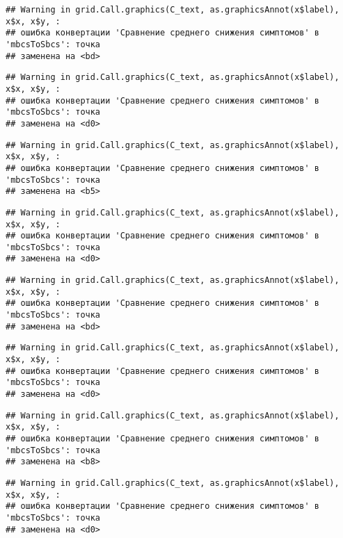 \documentclass[
]{article}
\begin{document}
\begin{verbatim}
## Warning in grid.Call.graphics(C_text, as.graphicsAnnot(x$label), x$x, x$y, :
## ошибка конвертации 'Сравнение среднего снижения симптомов' в 'mbcsToSbcs': точка
## заменена на <bd>
\end{verbatim}

\begin{verbatim}
## Warning in grid.Call.graphics(C_text, as.graphicsAnnot(x$label), x$x, x$y, :
## ошибка конвертации 'Сравнение среднего снижения симптомов' в 'mbcsToSbcs': точка
## заменена на <d0>
\end{verbatim}

\begin{verbatim}
## Warning in grid.Call.graphics(C_text, as.graphicsAnnot(x$label), x$x, x$y, :
## ошибка конвертации 'Сравнение среднего снижения симптомов' в 'mbcsToSbcs': точка
## заменена на <b5>
\end{verbatim}

\begin{verbatim}
## Warning in grid.Call.graphics(C_text, as.graphicsAnnot(x$label), x$x, x$y, :
## ошибка конвертации 'Сравнение среднего снижения симптомов' в 'mbcsToSbcs': точка
## заменена на <d0>
\end{verbatim}

\begin{verbatim}
## Warning in grid.Call.graphics(C_text, as.graphicsAnnot(x$label), x$x, x$y, :
## ошибка конвертации 'Сравнение среднего снижения симптомов' в 'mbcsToSbcs': точка
## заменена на <bd>
\end{verbatim}

\begin{verbatim}
## Warning in grid.Call.graphics(C_text, as.graphicsAnnot(x$label), x$x, x$y, :
## ошибка конвертации 'Сравнение среднего снижения симптомов' в 'mbcsToSbcs': точка
## заменена на <d0>
\end{verbatim}

\begin{verbatim}
## Warning in grid.Call.graphics(C_text, as.graphicsAnnot(x$label), x$x, x$y, :
## ошибка конвертации 'Сравнение среднего снижения симптомов' в 'mbcsToSbcs': точка
## заменена на <b8>
\end{verbatim}

\begin{verbatim}
## Warning in grid.Call.graphics(C_text, as.graphicsAnnot(x$label), x$x, x$y, :
## ошибка конвертации 'Сравнение среднего снижения симптомов' в 'mbcsToSbcs': точка
## заменена на <d0>
\end{verbatim}
\end{document}
